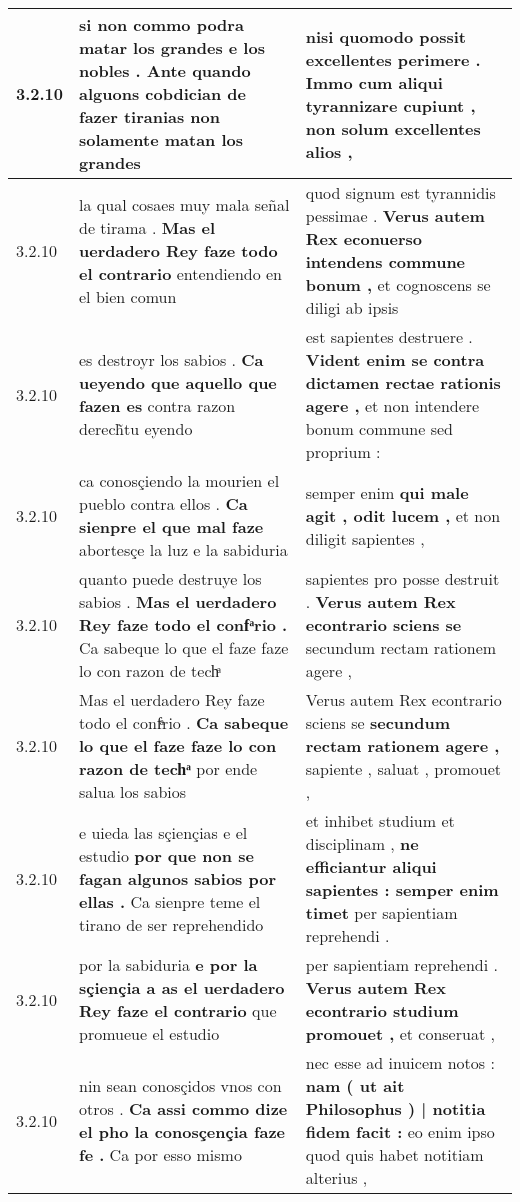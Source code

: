 \begin{tabular}{|p{1cm}|p{6.5cm}|p{6.5cm}|}
3.2.10 & si non commo podra matar los grandes e los nobles . \textbf{ Ante quando alguons cobdician de fazer tiranias } non solamente matan los grandes & nisi quomodo possit excellentes perimere . \textbf{ Immo cum aliqui tyrannizare cupiunt , } non solum excellentes alios , \\\hline
3.2.10 & la qual cosaes muy mala señal de tirama . \textbf{ Mas el uerdadero Rey faze todo el contrario } entendiendo en el bien comun & quod signum est tyrannidis pessimae . \textbf{ Verus autem Rex econuerso intendens commune bonum , } et cognoscens se diligi ab ipsis \\\hline
3.2.10 & es destroyr los sabios . \textbf{ Ca ueyendo que aquello que fazen es } contra razon derech̃tu eyendo & est sapientes destruere . \textbf{ Vident enim se contra dictamen rectae rationis agere , } et non intendere bonum commune sed proprium : \\\hline
3.2.10 & ca conosçiendo la mourien el pueblo contra ellos . \textbf{ Ca sienpre el que mal faze } abortesçe la luz e la sabiduria & semper enim \textbf{ qui male agit , odit lucem , } et non diligit sapientes , \\\hline
3.2.10 & quanto puede destruye los sabios . \textbf{ Mas el uerdadero Rey faze todo el confͣrio . } Ca sabeque lo que el faze faze lo con razon de techͣ & sapientes pro posse destruit . \textbf{ Verus autem Rex econtrario sciens se } secundum rectam rationem agere , \\\hline
3.2.10 & Mas el uerdadero Rey faze todo el confͣrio . \textbf{ Ca sabeque lo que el faze faze lo con razon de techͣ } por ende salua los sabios & Verus autem Rex econtrario sciens se \textbf{ secundum rectam rationem agere , } sapiente , saluat , promouet , \\\hline
3.2.10 & e uieda las sçiençias e el estudio \textbf{ por que non se fagan algunos sabios por ellas . } Ca sienpre teme el tirano de ser reprehendido & et inhibet studium et disciplinam , \textbf{ ne efficiantur aliqui sapientes : semper enim timet } per sapientiam reprehendi . \\\hline
3.2.10 & por la sabiduria \textbf{ e por la sçiençia a as el uerdadero Rey faze el contrario } que promueue el estudio & per sapientiam reprehendi . \textbf{ Verus autem Rex econtrario studium promouet , } et conseruat , \\\hline
3.2.10 & nin sean conosçidos vnos con otros . \textbf{ Ca assi commo dize el pho la conosçençia faze fe . } Ca por esso mismo & nec esse ad inuicem notos : \textbf{ nam ( ut ait Philosophus ) | notitia fidem facit : } eo enim ipso quod quis habet notitiam alterius , \\\hline

\end{tabular}
